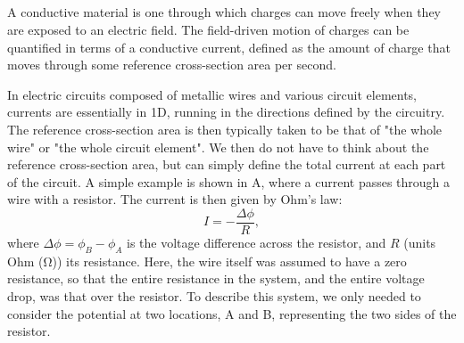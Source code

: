 \subsection{}
\label{sec:Basics:ConductiveCurrent}
A conductive material  is one through which charges can move freely when they are exposed to an electric field. The field-driven motion of charges can be quantified in terms of a conductive current, defined as the amount of charge that moves through some reference cross-section area per second.

In electric circuits composed of metallic wires and various circuit elements, currents are essentially in 1D, running in the directions defined by the circuitry. The reference cross-section area is then typically taken to be that of "the whole wire" or "the whole circuit element". We then do not have to think about the reference cross-section area, but can simply define the total current at each part of the circuit. A simple example is shown in A, where a current passes through a wire with a resistor. The current is then given by Ohm's law:
\begin{equation}
I = - \frac{\Delta \phi}{R},
\label{eq:Basics:Ohm_R}
\end{equation}
where $\Delta \phi = \phi_B-\phi_A$ is the voltage difference across the resistor, and $R$ (units Ohm (\si{\ohm})) its resistance. Here, the wire itself was assumed to have a zero resistance, so that the entire resistance in the system, and the entire voltage drop, was that over the resistor. To describe this system, we only needed to consider the potential at two locations, A and B, representing the two sides of the resistor.

